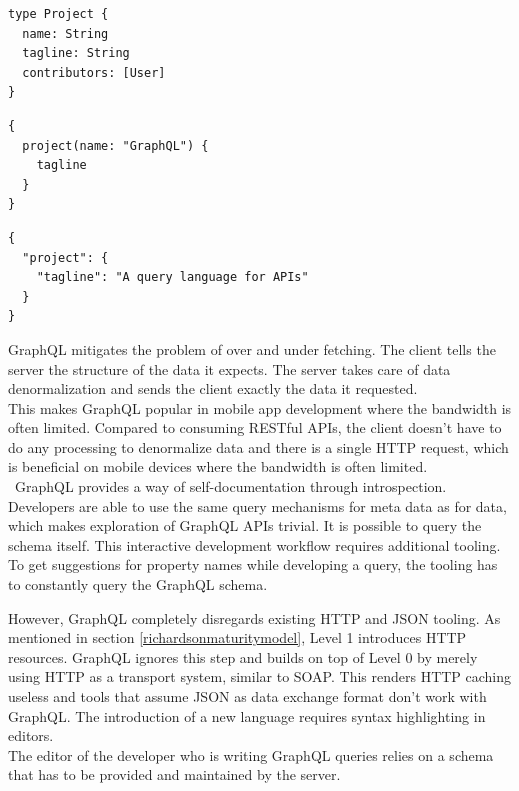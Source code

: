 \lstset{language=GraphQL}
\begin{lstlisting}[caption=Simple data model in the GraphQL data description language. \citep{graphql}, label=lst:graphqlmodel]
type Project {
  name: String
  tagline: String
  contributors: [User]
}
\end{lstlisting}
\lstset{language=GraphQL}
\begin{lstlisting}[caption=Example of a GraphQL query to fetch the tagline of a certain project. \citep{graphql}, label=lst:graphqlquery]
{
  project(name: "GraphQL") {
    tagline
  }
}
\end{lstlisting}
\lstset{language=JSON}
\begin{lstlisting}[caption=Response of the GraphQL server in JSON. \citep{graphql}, label=lst:graphqlresponse]
{
  "project": {
    "tagline": "A query language for APIs"
  }
}\end{lstlisting}

GraphQL mitigates the problem of over and under fetching. The client tells the server the structure of the data it expects. The server takes care of data denormalization and sends the client exactly the data it requested. \\
This makes GraphQL popular in mobile app development where the bandwidth is often limited. Compared to consuming RESTful APIs, the client doesn't have to do any processing to denormalize data and there is a single HTTP request, which is beneficial on mobile devices where the bandwidth is often limited. \\\
GraphQL provides a way of self-documentation through introspection. Developers are able to use the same query mechanisms for meta data as for data, which makes exploration of GraphQL APIs trivial. It is possible to query the schema itself. This interactive development workflow requires additional tooling. To get suggestions for property names while developing a query, the tooling has to constantly query the GraphQL schema.

However, GraphQL completely disregards existing HTTP and JSON tooling. As mentioned in section \ref{richardsonmaturitymodel}, Level 1 introduces HTTP resources. GraphQL ignores this step and builds on top of Level 0 by merely using HTTP as a transport system, similar to SOAP. This renders HTTP caching useless and tools that assume JSON as data exchange format don't work with GraphQL. The introduction of a new language requires syntax highlighting in editors. \\
The editor of the developer who is writing GraphQL queries relies on a schema that has to be provided and maintained by the server.

